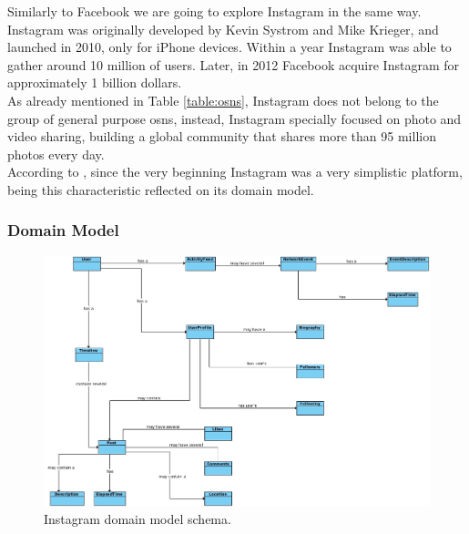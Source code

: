Similarly to Facebook we are going to explore Instagram in the same way. Instagram was originally developed by Kevin Systrom and Mike Krieger, and launched in 2010, only
for iPhone devices. Within a year Instagram was able to gather around 10 million of users. Later, in 2012 Facebook acquire Instagram for approximately 1 billion dollars.\\
\indent As already mentioned in Table \ref{table:osns}, Instagram does not belong to the group of general purpose \glspl{osn}, instead, Instagram specially focused on photo
and video sharing, building a global community that shares more than 95 million photos every day.\\
\indent According to \cite{instabout}, since
the very beginning Instagram was a very simplistic platform, being this characteristic reflected on its domain model.

\subsubsection*{Domain Model}

\begin{figure}[h!]
  \hspace*{-1in}
  \includegraphics[width=1.28\textwidth]{img/instagram-domain-model.jpg}
\caption{\label{img:instadomain} Instagram domain model schema.}
\end{figure}

